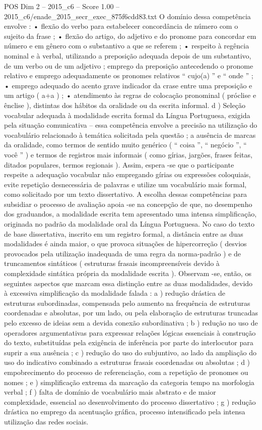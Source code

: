\begin{textsample}{POS Dim 2 – 2015\_c6 – Score 1.00 – 2015\_c6/enade\_2015\_secr\_exec\_875f6cdd83.txt}
O domínio dessa competência envolve : • flexão do verbo para estabelecer concordância de número com o sujeito da frase ; • flexão do artigo, do adjetivo e do pronome para concordar em número e em gênero com o substantivo a que se referem ; • respeito à regência nominal e à verbal, utilizando a preposição adequada depois de um substantivo, de um verbo ou de um adjetivo ; emprego da preposição antecedendo o pronome relativo e emprego adequadamente os pronomes relativos “ cujo(a) ” e “ onde ” ; • emprego adequado do acento grave indicador da crase entre uma preposição e um artigo ( a+a ) ; • atendimento às regras de colocação pronominal ( próclise e ênclise ), distintas dos hábitos da oralidade ou da escrita informal. d ) Seleção vocabular adequada à modalidade escrita formal da Língua Portuguesa, exigida pela situação comunicativa – essa competência envolve a precisão na utilização do vocabulário relacionado à temática solicitada pela questão ; a ausência de marcas da oralidade, como termos de sentido muito genérico ( “ coisa ”, “ negócio ”, “ você ” ) e termos de registros mais informais ( como gírias, jargões, frases feitas, ditados populares, termos regionais ).
Assim, espera -se que o participante respeite a adequação vocabular não empregando gírias ou expressões coloquiais, evite repetição desnecessária de palavras e utilize um vocabulário mais formal, como solicitado por um texto dissertativo.
A escolha dessas competências para subsidiar o processo de avaliação apoia -se na concepção de que, no desempenho dos graduandos, a modalidade escrita tem apresentado uma intensa simplificação, originada no padrão da modalidade oral da Língua Portuguesa.
No caso do texto de base dissertativa, inscrito em um registro formal, a distância entre as duas modalidades é ainda maior, o que provoca situações de hipercorreção ( desvios provocados pela utilização inadequada de uma regra da norma-padrão ) e de truncamentos sintáticos ( estruturas frasais incompreensíveis devido à complexidade sintática própria da modalidade escrita ).
Observam -se, então, os seguintes aspectos que marcam essa distinção entre as duas modalidades, devido à excessiva simplificação da modalidade falada : a ) redução drástica de estruturas subordinadas, compensada pelo aumento na frequência de estruturas coordenadas e absolutas, por um lado, ou pela elaboração de estruturas truncadas pelo excesso de ideias sem a devida conexão subordinativa ; b ) redução no uso de operadores argumentativas para expressar relações lógicas essenciais à construção do texto, substituídas pela exigência de inferência por parte do interlocutor para suprir a sua ausência ; c ) redução do uso do subjuntivo, ao lado da ampliação do uso do indicativo combinado a estruturas frasais coordenadas ou absolutas ; d ) empobrecimento do processo de referenciação, com a repetição de pronomes ou nomes ; e ) simplificação extrema da marcação da categoria tempo na morfologia verbal ; f ) falta de domínio de vocabulário mais abstrato e de maior complexidade, essencial ao desenvolvimento do processo dissertativo ; g ) redução drástica no emprego da acentuação gráfica, processo intensificado pela intensa utilização das redes sociais.

\end{textsample}
